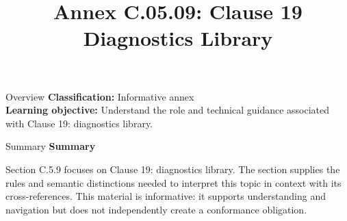 \documentclass[10pt,letterpaper]{article}
\title{Annex C.05.09: Clause 19 Diagnostics Library}
\author{}
\date{}
\begin{document}
\maketitle
\begin{CornellOverviewBox}{Overview}
\textbf{Classification:} Informative annex\\[2pt]
\textbf{Learning objective:} Understand the role and technical guidance associated with Clause 19: diagnostics library.
\end{CornellOverviewBox}\begin{CornellSummaryBox}{Summary}
{\sffamily\bfseries\color{Accent} Summary}\par\vspace{3pt}Section C.5.9 focuses on Clause 19: diagnostics library. The section supplies the rules and semantic distinctions needed to interpret this topic in context with its cross-references. This material is informative: it supports understanding and navigation but does not independently create a conformance obligation.
\end{CornellSummaryBox}
\end{document}
